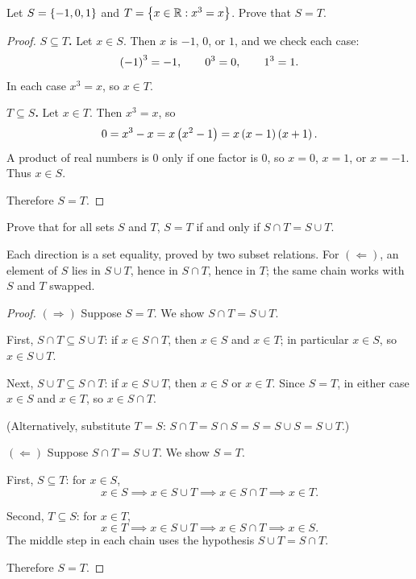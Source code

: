 \begin{example}
    Let $S = \left\{-1, 0, 1\right\}$ and $T = \left\{x \in \mathbb{R} : x^3 = x\right\}$. Prove that
    $S = T$.
\end{example}
\begin{proof}
    \textbf{$S \subseteq T$.} Let $x \in S$. Then $x$ is $-1$, $0$, or $1$,
    and we check each case:
    \begin{equation*}
        \left(-1\right)^3 = -1, \qquad 0^3 = 0, \qquad 1^3 = 1.
    \end{equation*}
    In each case $x^3 = x$, so $x \in T$.

    \textbf{$T \subseteq S$.} Let $x \in T$. Then $x^3 = x$, so
    \begin{equation*}
        0 = x^3 - x = x\left(x^2 - 1\right) = x\left(x - 1\right)\left(x + 1\right).
    \end{equation*}
    A product of real numbers is $0$ only if one factor is $0$, so $x = 0$,
    $x = 1$, or $x = -1$. Thus $x \in S$.

    Therefore $S = T$.
\end{proof}

\begin{example}
    Prove that for all sets $S$ and $T$, $S = T$ if and only if
    $S \cap T = S \cup T$.
\end{example}
\begin{remark}
    Each direction is a set equality, proved by two subset relations. For
    $(\Leftarrow)$, an element of $S$ lies in $S \cup T$, hence in
    $S \cap T$, hence in $T$; the same chain works with $S$ and $T$
    swapped.
\end{remark}
\begin{proof}
    $(\Rightarrow)$ Suppose $S = T$. We show $S \cap T = S \cup T$.

    First, $S \cap T \subseteq S \cup T$: if $x \in S \cap T$, then
    $x \in S$ and $x \in T$; in particular $x \in S$, so $x \in S \cup T$.

    Next, $S \cup T \subseteq S \cap T$: if $x \in S \cup T$, then
    $x \in S$ or $x \in T$. Since $S = T$, in either case $x \in S$ and
    $x \in T$, so $x \in S \cap T$.

    (Alternatively, substitute $T=S$: $S \cap T = S \cap S = S = S \cup S = S \cup T$.)

    $(\Leftarrow)$ Suppose $S \cap T = S \cup T$. We show $S = T$.

    First, $S \subseteq T$: for $x\in S$,
    \begin{equation*}
        x \in S \implies x \in S \cup T \implies x \in S \cap T \implies x \in T.
    \end{equation*}

    Second, $T \subseteq S$: for $x\in T$,
    \begin{equation*}
        x \in T \implies x \in S \cup T \implies x \in S \cap T \implies x \in S.
    \end{equation*}
    The middle step in each chain uses the hypothesis $S \cup T = S \cap T$.

    Therefore $S = T$.
\end{proof}

